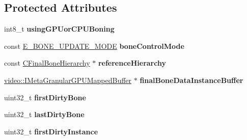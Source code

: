 \subsection*{Protected Attributes}
\begin{DoxyCompactItemize}
\item 
int8\+\_\+t {\bfseries using\+G\+P\+Uor\+C\+P\+U\+Boning}\hypertarget{classirr_1_1scene_1_1ISkinningStateManager_ab7da18a30f7fd16f8ecbd3ceac2c710e}{}\label{classirr_1_1scene_1_1ISkinningStateManager_ab7da18a30f7fd16f8ecbd3ceac2c710e}

\item 
const \hyperlink{classirr_1_1scene_1_1ISkinningStateManager_a78f9d8d280dc029b3637bd3a48c0c3c6}{E\+\_\+\+B\+O\+N\+E\+\_\+\+U\+P\+D\+A\+T\+E\+\_\+\+M\+O\+DE} {\bfseries bone\+Control\+Mode}\hypertarget{classirr_1_1scene_1_1ISkinningStateManager_ac12fa09fde99d4e78766596fa1c2c471}{}\label{classirr_1_1scene_1_1ISkinningStateManager_ac12fa09fde99d4e78766596fa1c2c471}

\item 
const \hyperlink{classirr_1_1scene_1_1CFinalBoneHierarchy}{C\+Final\+Bone\+Hierarchy} $\ast$ {\bfseries reference\+Hierarchy}\hypertarget{classirr_1_1scene_1_1ISkinningStateManager_a58e5cef9c776ae57e47290327949b5be}{}\label{classirr_1_1scene_1_1ISkinningStateManager_a58e5cef9c776ae57e47290327949b5be}

\item 
\hyperlink{classirr_1_1video_1_1IMetaGranularGPUMappedBuffer}{video\+::\+I\+Meta\+Granular\+G\+P\+U\+Mapped\+Buffer} $\ast$ {\bfseries final\+Bone\+Data\+Instance\+Buffer}\hypertarget{classirr_1_1scene_1_1ISkinningStateManager_a849404f9f8f4b10ca4cff31359b98298}{}\label{classirr_1_1scene_1_1ISkinningStateManager_a849404f9f8f4b10ca4cff31359b98298}

\item 
uint32\+\_\+t {\bfseries first\+Dirty\+Bone}\hypertarget{classirr_1_1scene_1_1ISkinningStateManager_a99fdbc0a2932b22970b43d9df2e8fd64}{}\label{classirr_1_1scene_1_1ISkinningStateManager_a99fdbc0a2932b22970b43d9df2e8fd64}

\item 
uint32\+\_\+t {\bfseries last\+Dirty\+Bone}\hypertarget{classirr_1_1scene_1_1ISkinningStateManager_ac885e4f883ccbec6799ea65704e7b2c5}{}\label{classirr_1_1scene_1_1ISkinningStateManager_ac885e4f883ccbec6799ea65704e7b2c5}

\item 
uint32\+\_\+t {\bfseries first\+Dirty\+Instance}\hypertarget{classirr_1_1scene_1_1ISkinningStateManager_a17b4ced3198ae226cd03c06fb3758716}{}\label{classirr_1_1scene_1_1ISkinningStateManager_a17b4ced3198ae226cd03c06fb3758716}


\end{DoxyCompactItemize}
